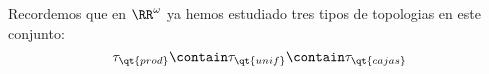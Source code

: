 Recordemos que en $ \RR^\omega $ ya hemos estudiado tres tipos de topologias en este conjunto:
\[ \tau_{\qt{prod}} \contain \tau_{\qt{unif}} \contain \tau_{\qt{cajas}} \]